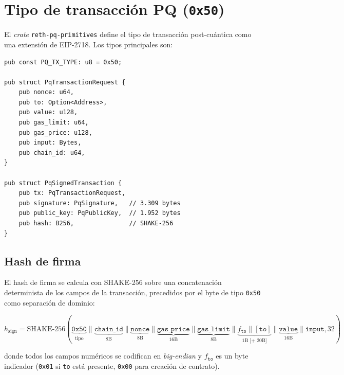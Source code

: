 \section{Tipo de transacción PQ (\texttt{0x50})}
\label{sec:dev_tx}

El \emph{crate} \texttt{reth-pq-primitives} define el tipo de transacción post-cuántica como una extensión de EIP-2718. Los tipos principales son:

\begin{lstlisting}[style=rustcode, caption={Tipos de transacción PQ.}, label={lst:pq_tx_types}]
pub const PQ_TX_TYPE: u8 = 0x50;

pub struct PqTransactionRequest {
    pub nonce: u64,
    pub to: Option<Address>,
    pub value: u128,
    pub gas_limit: u64,
    pub gas_price: u128,
    pub input: Bytes,
    pub chain_id: u64,
}

pub struct PqSignedTransaction {
    pub tx: PqTransactionRequest,
    pub signature: PqSignature,   // 3.309 bytes
    pub public_key: PqPublicKey,  // 1.952 bytes
    pub hash: B256,               // SHAKE-256
}
\end{lstlisting}

\subsection{Hash de firma}

El hash de firma se calcula con SHAKE-256 sobre una concatenación determinista de los campos de la transacción, precedidos por el byte de tipo \texttt{0x50} como separación de dominio:

\begin{equation}
  h_{\text{sign}} = \text{SHAKE-256}(
    \underbrace{\texttt{0x50}}_{\text{tipo}} \|
    \underbrace{\texttt{chain\_id}}_{\text{8B}} \|
    \underbrace{\texttt{nonce}}_{\text{8B}} \|
    \underbrace{\texttt{gas\_price}}_{\text{16B}} \|
    \underbrace{\texttt{gas\_limit}}_{\text{8B}} \|
    \underbrace{f_{\texttt{to}} \| [\texttt{to}]}_{\text{1B [+ 20B]}} \|
    \underbrace{\texttt{value}}_{\text{16B}} \|
    \texttt{input}
  , 32)
\end{equation}

donde todos los campos numéricos se codifican en \emph{big-endian} y $f_{\texttt{to}}$ es un byte indicador (\texttt{0x01} si \texttt{to} está presente, \texttt{0x00} para creación de contrato).

